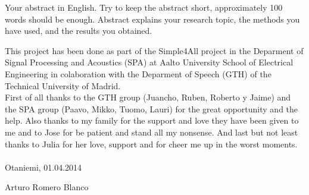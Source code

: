 \documentclass[english,12pt,a4paper,pdftex]{article}
\begin{document}
\makecoverpage

\newpage
%
\begin{abstractpage}[english]
 Your abstract in English. Try to keep the abstract short, approximately 
 100 words should be enough. Abstract explains your research topic, 
 the methods you have used, and the results you obtained.  
\end{abstractpage}
%
This project has been done as part of the Simple4All project in the Deparment of Signal Processing and Acoustics (SPA)  at Aalto University School of Electrical Engineering in colaboration with the Deparment of Speech (GTH) of the Technical University of Madrid.\\
First of all thanks to the GTH group (Juancho, Ruben, Roberto y Jaime) and the SPA group (Paavo, Mikko, Tuomo, Lauri) for the great opportunity and the help.
Also thanks to my family for the support and love they have been given to me and to Jose for be patient and stand all my nonsense.
And last but not least thanks to Julia for her love, support and for cheer me up in the worst moments.\\\\
\vspace{5cm}
Otaniemi, 01.04.2014

\vspace{5mm}
{\hfill Arturo Romero Blanco \hspace{1cm}}

\newpage

\thesistableofcontents
\newpage
\listoffigures
\listoftables
\end{document}
